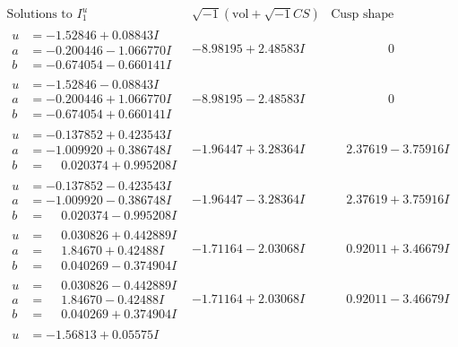 \documentclass[1p]{elsarticle_modified}
\theoremstyle{definition}
\newcommand{\I}{\sqrt{-1}}
\begin{document}
$$\begin{array}{c|c|c}
\text{Solutions to }I^u_{1}& \I (\text{vol} + \sqrt{-1}CS) & \text{Cusp shape}\\
 \hline 
\begin{aligned}
u &= -1.52846 + 0.08843 I \\
a &= -0.200446 - 1.066770 I \\
b &= -0.674054 - 0.660141 I\end{aligned}
 & -8.98195 + 2.48583 I & \phantom{-0.000000 } 0 \\ \hline\begin{aligned}
u &= -1.52846 - 0.08843 I \\
a &= -0.200446 + 1.066770 I \\
b &= -0.674054 + 0.660141 I\end{aligned}
 & -8.98195 - 2.48583 I & \phantom{-0.000000 } 0 \\ \hline\begin{aligned}
u &= -0.137852 + 0.423543 I \\
a &= -1.009920 + 0.386748 I \\
b &= \phantom{-}0.020374 + 0.995208 I\end{aligned}
 & -1.96447 + 3.28364 I & \phantom{-}2.37619 - 3.75916 I \\ \hline\begin{aligned}
u &= -0.137852 - 0.423543 I \\
a &= -1.009920 - 0.386748 I \\
b &= \phantom{-}0.020374 - 0.995208 I\end{aligned}
 & -1.96447 - 3.28364 I & \phantom{-}2.37619 + 3.75916 I \\ \hline\begin{aligned}
u &= \phantom{-}0.030826 + 0.442889 I \\
a &= \phantom{-}1.84670 + 0.42488 I \\
b &= \phantom{-}0.040269 - 0.374904 I\end{aligned}
 & -1.71164 - 2.03068 I & \phantom{-}0.92011 + 3.46679 I \\ \hline\begin{aligned}
u &= \phantom{-}0.030826 - 0.442889 I \\
a &= \phantom{-}1.84670 - 0.42488 I \\
b &= \phantom{-}0.040269 + 0.374904 I\end{aligned}
 & -1.71164 + 2.03068 I & \phantom{-}0.92011 - 3.46679 I \\ \hline\begin{aligned}
u &= -1.56813 + 0.05575 I \\

\end{aligned}
\end{array}$$
\end{document}
